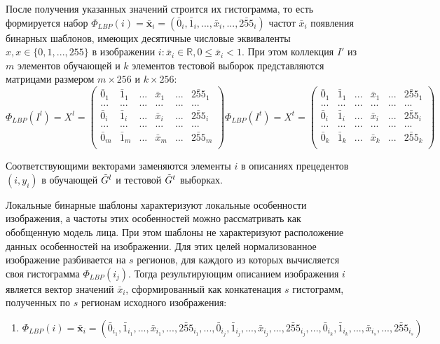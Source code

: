 \documentclass[12pt,a4paper]{article}
\begin{document}
После получения указанных значений строится их гистограмма, то есть формируется набор $\Phi_{LBP}(i)=\bar{\textbf{x}}_i=(\bar{0}_i,\bar{1}_i,...,\bar{x}_i,...,\bar{255}_i)$ частот $\bar{x}_i$ появления бинарных шаблонов, имеющих десятичные числовые эквиваленты $x,x\in\{0,1,...,255\}$ в изображении $i:\bar{x}_i\in\mathbb{R},0\leq\bar{x}_i<1$. При этом коллекция $I'$ из $m$ элементов обучающей и $k$ элементов тестовой выборок представляются матрицами размером $m\times256$ и $k\times256$:
\begin{equation}
    \Phi_{LBP}(I^l)=X^l=
        \begin{pmatrix}
            \bar{0}_1 & \bar{1}_1 & ... & \bar{x}_1 & ... & \bar{255}_1\\
            ... & ... & ... & ... & ... & ...\\
            \bar{0}_i & \bar{1}_i & ... & \bar{x}_i & ... & \bar{255}_i\\
            ... & ... & ... & ... & ... & ...\\
            \bar{0}_m & \bar{1}_m & ... & \bar{x}_m & ... & \bar{255}_m\\
        \end{pmatrix}
    \Phi_{LBP}(I^t)=X^t=
        \begin{pmatrix}
            \bar{0}_1 & \bar{1}_1 & ... & \bar{x}_1 & ... & \bar{255}_1\\
            ... & ... & ... & ... & ... & ...\\
            \bar{0}_i & \bar{1}_i & ... & \bar{x}_i & ... & \bar{255}_i\\
            ... & ... & ... & ... & ... & ...\\
            \bar{0}_k & \bar{1}_k & ... & \bar{x}_k & ... & \bar{255}_k\\
        \end{pmatrix}
\end{equation}

Соответствующими векторами заменяются элементы $i$ в описаниях прецедентов $(i,y_i)$ в обучающей $\Tilde{G}^l$ и тестовой $\Tilde{G}^t$ выборках.

Локальные бинарные шаблоны характеризуют локальные особенности изображения, а частоты этих особенностей можно рассматривать как обобщенную модель лица. При этом шаблоны не характеризуют расположение данных особенностей на изображении. Для этих целей нормализованное изображение разбивается на $s$ регионов, для каждого из которых вычисляется своя гистограмма $\Phi_{LBP}(i_j)$. Тогда результирующим описанием изображения $i$ является вектор значений $\bar{x}_i$, сформированный как конкатенация $s$ гистограмм, полученных по $s$ регионам исходного изображения:
\begin{enumerate}
    \item $\Phi_{LBP}(i)=\bar{\textbf{x}}_i=(\bar{0}_{i_1},\bar{1}_{i_1},...,\bar{x}_{i_1},...,\bar{255}_{i_1},...,\bar{0}_{i_j},\bar{1}_{i_j},...,\bar{x}_{i_j},...,\bar{255}_{i_j},...,\bar{0}_{i_k},\bar{1}_{i_k},...,\bar{x}_{i_s},...,\bar{255}_{i_s})$
\end{enumerate}
\end{document}
